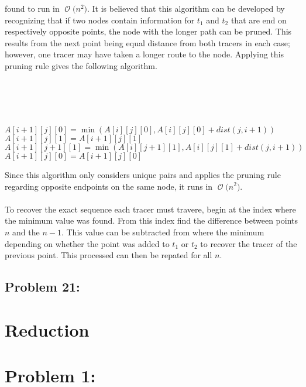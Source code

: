 \documentclass[12pt]{article}
\newcommand{\BigO}[1]{\ensuremath{\operatorname{\mathcal{O}}\bigl(#1\bigr)}}
\begin{document}
found to run in \BigO{n^2}.
It is believed that this algorithm can be developed by recognizing that
if two nodes contain information for $t_1$ and $t_2$ that are
end on respectively opposite points, the node with the longer
path can be pruned.  This results from the next point being
equal distance from both tracers in each case; however,
one tracer may have taken a longer route to the node.  Applying
this pruning rule gives the following algorithm.\\\\
\begin{algorithm}[H]
\\
\\
\\
 {
     {
         {
            $A[i+1][j][0] = \min(A[i][j][0], A[i][j][0] + dist(j,i+1))$\\
            $A[i+1][j][1] = A[i+1][j][1]$\\
            $A[i+1][j+1][1] = \min(A[i][j+1][1], A[i][j][1] + dist(j,i+1))$\\
            $A[i+1][j][0] = A[i+1][j][0]$\\
        }
    }
}
\end{algorithm}
Since this algorithm only considers unique pairs and applies the pruning
rule regarding opposite endpoints on the same node, it runs in \BigO{n^2}.\\\\
To recover the exact sequence each tracer must travere, begin at the 
index where the minimum value was found. From this index find the difference
between points $n$ and the $n-1$.  This value can be subtracted from where the
minimum depending on whether the point was added to $t_1$ or $t_2$ to recover
the tracer of the previous point.  This processed can then be repated for all
$n$.   
\subsection*{Problem 21: }

\section*{Reduction}
\section*{Problem 1: }
\end{document}
